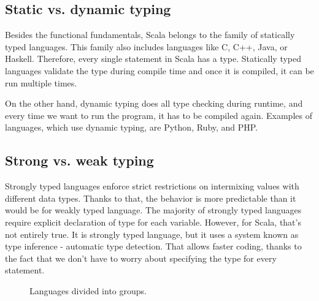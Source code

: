 \subsection{Static vs. dynamic typing}
Besides the functional fundamentals, Scala belongs to the family of statically typed languages. This family also includes languages like C, C++, Java, or Haskell. Therefore, every single statement in Scala has a type.\cite{Static vs dynamic} Statically typed languages validate the type during compile time and once it is compiled, it can be run multiple times.

On the other hand, dynamic typing does all type checking during runtime, and every time we want to run the program, it has to be compiled again. Examples of languages, which use dynamic typing, are Python, Ruby, and PHP.

\subsection{Strong vs. weak typing}
Strongly typed languages enforce strict restrictions on intermixing values with different data types. Thanks to that, the behavior is more predictable than it would be for weakly typed language. The majority of strongly typed languages require explicit declaration of type for each variable. However, for Scala, that's not entirely true. It is strongly typed language, but it uses a system known as type inference - automatic type detection. That allows faster coding, thanks to the fact that we don’t have to worry about specifying the type for every statement. 

\begin{figure}[h]
  \caption {Languages divided into groups.\cite{Static vs dynamic}}
\end{figure}

